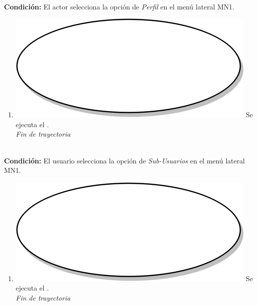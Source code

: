 \textbf{} \\
\textbf{Condición:} El actor selecciona la opción de \textit{Perfil} en el menú lateral MN1. \\
 \begin{enumerate}[label=M\arabic*]
    \item {\includegraphics[scale=.05]{Capitulo3/img/proceso.png} Se ejecuta el \textbf{}.} \\
    \textit{Fin de trayectoria} \\
\end{enumerate}

\textbf{} \\
\textbf{Condición:} El usuario selecciona la opción de \textit{Sub-Usuarios} en el menú lateral MN1. \\
 \begin{enumerate}[label=N\arabic*]
    \item {\includegraphics[scale=.05]{Capitulo3/img/proceso.png} Se ejecuta el \textbf{}.} \\
    \textit{Fin de trayectoria} \\
\end{enumerate}

